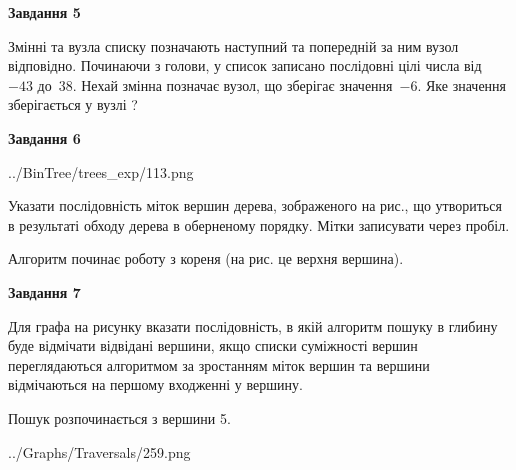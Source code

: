 \documentclass[12pt, ukrainian]{article}
\begin{document}
{\begin {large}
{\begin {center}\textbf{Завдання 5}\end {center}}\par
Змінні  та  вузла списку позначають наступний та попередній за ним вузол відповідно. Починаючи з голови, у список записано послідовні цілі числа від~$-43$ до~$38$. Нехай змінна  позначає вузол, що зберігає значення~$-6$.
Яке значення зберігається у вузлі  ?\par
\newpage

{\begin {center}\textbf{Завдання 6}\end {center}}\par

\begin{center}
	{../BinTree/trees_exp/113.png}
\end{center}
Указати послідовність міток вершин дерева, зображеного на рис., що утвориться в результаті обходу дерева в оберненому порядку. Мітки записувати через пробіл.\par Алгоритм починає роботу з кореня (на рис. це верхня вершина).\par
\newpage

{\begin {center}\textbf{Завдання 7}\end {center}}\par
Для графа на рисунку вказати послідовність, в якій алгоритм пошуку в глибину буде відмічати відвідані вершини, якщо списки суміжності вершин переглядаються алгоритмом за зростанням міток вершин та вершини відмічаються на першому вход\-женні у вершину.\par
Пошук розпочинається з вершини 5.\par

\begin{center}
	{../Graphs/Traversals/259.png}
\end{center}\par
\newpage


\end{large}}
\end{document}
